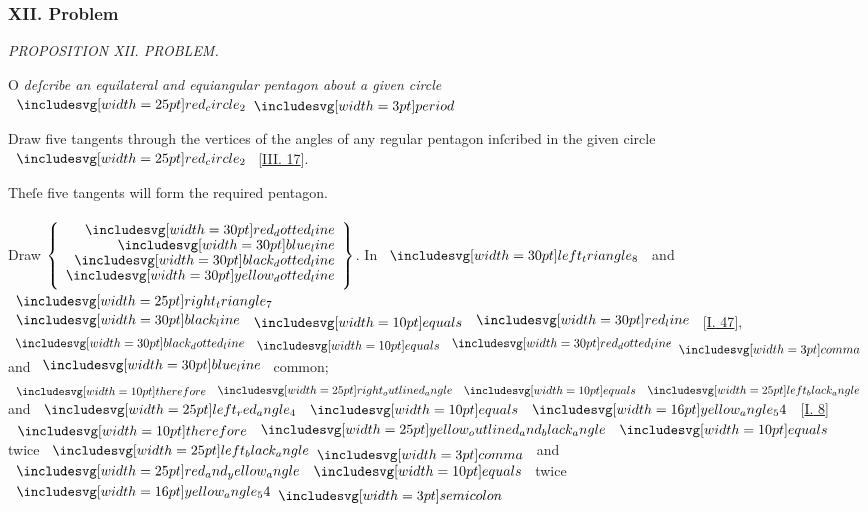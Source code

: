 \documentclass[11pt,preview]{standalone}
\begin{document}
\subsubsection{XII. Problem}

\begin{minipage}[t]{0.54\textwidth}
    \begin{center}
        \textit{PROPOSITION XII. PROBLEM.}\label{book4pr12} \\
    \end{center}

    \hfill

    \begin{center}
        \raggedright \lettrine[lines=3, loversize=1, nindent=0pt]{}{}O \textit{deſcribe an equilateral and equiangular pentagon about a given circle} $\img{red_circle_2} \bperiod$
    \end{center}
\end{minipage}%
\hfill
\begin{minipage}[t]{0.43\textwidth}
    \vspace{20pt}
    
\end{minipage}%

\hfill

\hfill

\raggedright Draw five tangents through the vertices of the angles of any regular pentagon inſcribed in the given circle $\img{red_circle_2}$ [\hyperref[book3pr17]{\textsc{III.} 17}].

\begin{center}
    Theſe five tangents will form the required pentagon.\\
    \hfill\\
    Draw $\left\{\begin{aligned}
            \dottedredline   \\[-2ex]
            \blueline        \\[-2ex]
            \dottedblackline \\[-2ex]
            \dottedyellowline
        \end{aligned}\right\}$. In $\img[0][0][30]{left_triangle_8}$ and $\img{right_triangle_7}$\\
    $\blackline \bequals \redline$ [\hyperref[book1pr47]{\textsc{I.} 47}],\\
    $\dottedblackline \bequals \dottedredline \bcomma$ and $\blueline$ common;\\
    $\btherefore \img{right_outlined_angle} \bequals \img{left_black_angle}$ and $\img{left_red_angle_4} \bequals \img[0][0][16]{yellow_angle_54}$ [\hyperref[book1pr8]{\textsc{I.} 8}]\\
    $\btherefore \img{yellow_outlined_and_black_angle} \bequals$ twice $\img{left_black_angle} \bcomma$ and $\img{red_and_yellow_angle} \bequals$ twice $\img[0][0][16]{yellow_angle_54} \bsemicolon$
\end{center}
\end{document}
